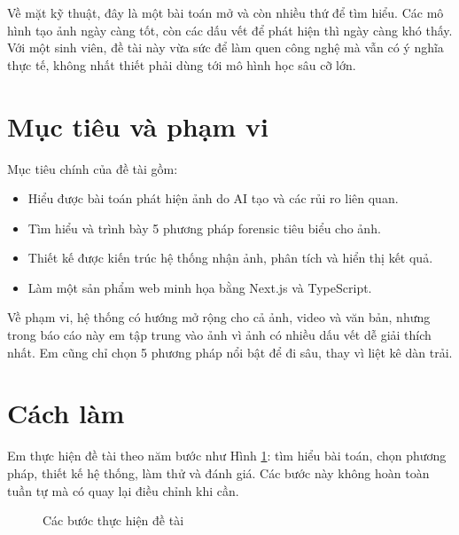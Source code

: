 \documentclass[14pt,a4paper,oneside]{report}
\begin{document}
Về mặt kỹ thuật, đây là một bài toán mở và còn nhiều thứ để tìm hiểu. Các mô hình tạo ảnh ngày càng tốt, còn các dấu vết để phát hiện thì ngày càng khó thấy. Với một sinh viên, đề tài này vừa sức để làm quen công nghệ mà vẫn có ý nghĩa thực tế, không nhất thiết phải dùng tới mô hình học sâu cỡ lớn.

\section{Mục tiêu và phạm vi}
Mục tiêu chính của đề tài gồm:
\begin{itemize}
  \item Hiểu được bài toán phát hiện ảnh do AI tạo và các rủi ro liên quan.
  \item Tìm hiểu và trình bày 5 phương pháp forensic tiêu biểu cho ảnh.
  \item Thiết kế được kiến trúc hệ thống nhận ảnh, phân tích và hiển thị kết quả.
  \item Làm một sản phẩm web minh họa bằng Next.js và TypeScript.
\end{itemize}

Về phạm vi, hệ thống có hướng mở rộng cho cả ảnh, video và văn bản, nhưng trong báo cáo này em tập trung vào ảnh vì ảnh có nhiều dấu vết dễ giải thích nhất. Em cũng chỉ chọn 5 phương pháp nổi bật để đi sâu, thay vì liệt kê dàn trải.

\section{Cách làm}
Em thực hiện đề tài theo năm bước như Hình \ref{fig:research-process}: tìm hiểu bài toán, chọn phương pháp, thiết kế hệ thống, làm thử và đánh giá. Các bước này không hoàn toàn tuần tự mà có quay lại điều chỉnh khi cần.

\begin{figure}[h]
\centering
{}
\caption{Các bước thực hiện đề tài}
\label{fig:research-process}
\end{figure}
\end{document}
